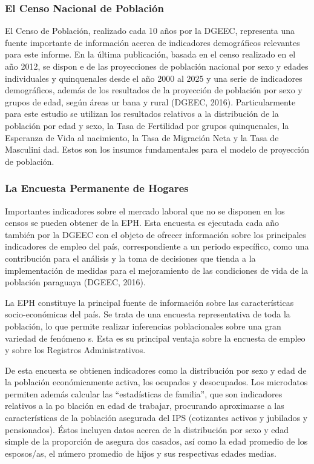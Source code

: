\subsubsection{El Censo Nacional de Población}

El Censo de Población, realizado cada 10 años por la DGEEC, representa
una fuente importante de información acerca de indicadores demográficos
relevantes para este informe. En la última publicación, basada en el
censo realizado en el año 2012, se dispon e de las proyecciones de
población nacional por sexo y edades individuales y quinquenales desde
el año 2000 al 2025 y una serie de indicadores demográficos, además de
los resultados de la proyección de población por sexo y grupos de edad,
según áreas ur bana y rural (DGEEC, 2016). Particularmente para este
estudio se utilizan los resultados relativos a la distribución de la
población por edad y sexo, la Tasa de Fertilidad por grupos
quinquenales, la Esperanza de Vida al nacimiento, la Tasa de Migración
Neta y la Tasa de Masculini dad. Estos son los insumos fundamentales
para el modelo de proyección de población.

\subsubsection{La Encuesta Permanente de Hogares }

Importantes indicadores sobre el mercado laboral que no se disponen en
los censos se pueden obtener de la EPH. Esta encuesta es ejecutada cada
año también por la DGEEC con el objeto de ofrecer información sobre los
principales indicadores de empleo del país, correspondiente a un periodo
específico, como una contribución para el análisis y la toma de
decisiones que tienda a la implementación de medidas para el
mejoramiento de las condiciones de vida de la población paraguaya
(DGEEC, 2016).

La EPH constituye la principal fuente de información sobre las
características socio-económicas del país. Se trata de una encuesta
representativa de toda la población, lo que permite realizar inferencias
poblacionales sobre una gran variedad de fenómeno s. Esta es su
principal ventaja sobre la encuesta de empleo y sobre los Registros
Administrativos.

De esta encuesta se obtienen indicadores como la distribución por sexo y
edad de la población económicamente activa, los ocupados y desocupados.
Los microdatos permiten además calcular las ``estadísticas de familia'',
que son indicadores relativos a la po blación en edad de trabajar,
procurando aproximarse a las características de la población asegurada
del IPS (cotizantes activos y jubilados y pensionados). Éstos incluyen
datos acerca de la distribución por sexo y edad simple de la proporción
de asegura dos casados, así como la edad promedio de los esposos/as, el
número promedio de hijos y sus respectivas edades medias.

